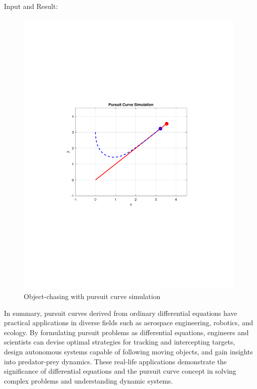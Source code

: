 \documentclass[13pt,a4paper]{report}
\begin{document}
Input and Result:\\[-0.35cm]

\begin{center}
\begin{figure}[H]
\centering
\includegraphics[trim={3.6cm 8.35cm 3.25cm 8cm},clip,scale=0.75]{pdfs/pursuit_curve.pdf}
\caption{Object-chasing with pursuit curve simulation}
\end{figure}
\end{center}

In summary, pursuit curves derived from ordinary differential equations have practical applications in diverse fields such as aerospace engineering, robotics, and ecology. By formulating pursuit problems as differential equations, engineers and scientists can devise optimal strategies for tracking and intercepting targets, design autonomous systems capable of following moving objects, and gain insights into predator-prey dynamics. These real-life applications demonstrate the significance of differential equations and the pursuit curve concept in solving complex problems and understanding dynamic systems.
\end{document}
